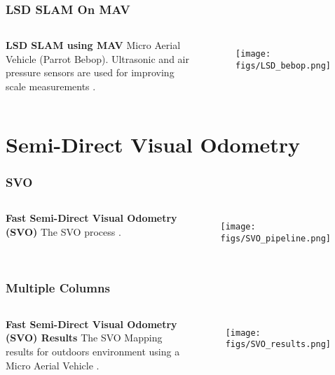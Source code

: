 \documentclass{beamer}
\begin{document}
\begin{frame}
\frametitle{LSD SLAM On MAV}
\begin{columns}[c] %

\tiny{\textbf{LSD SLAM using MAV } Micro Aerial Vehicle (Parrot Bebop).  Ultrasonic and air pressure sensors are used for improving scale measurements  \cite{von2016autonomous}.}
\begin{figure}
\texttt{[image: figs/LSD\_bebop.png]}	
\end{figure}
\end{columns}
\end{frame}
%
%
\section{Semi-Direct Visual Odometry}
\begin{frame}
\frametitle{SVO}
\begin{columns}[c] %

\tiny{\textbf{Fast Semi-Direct Visual Odometry (SVO)} The SVO process \cite{forster2014svo}.}
\begin{figure}
\texttt{[image: figs/SVO\_pipeline.png]}	
\end{figure}
\end{columns}
\end{frame}

\begin{frame}
\frametitle{Multiple Columns}
\begin{columns}[c] %

\tiny{\textbf{Fast Semi-Direct Visual Odometry (SVO) Results} The SVO Mapping results for outdoors environment using a Micro Aerial Vehicle \cite{forster2014svo}.}
\begin{figure}
\texttt{[image: figs/SVO\_results.png]}	
\end{figure}
\end{columns}
\end{frame}
\end{document}

